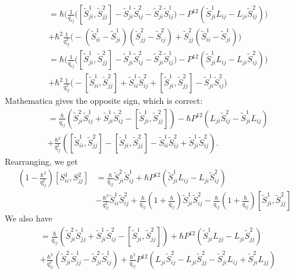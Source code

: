 \documentclass[11pt]{report}
\theoremstyle{definition}
\theoremstyle{remark}
\theoremstyle{remark}
\begin{document}
\begin{align*}
&= \hbar \bigg( \frac{1}{q_{ij}} \bigg( [\tilde S_{ji}^1,\tilde S_{jj}^2] - \tilde S_{ji}^1 \tilde S_{ij}^2 - \tilde S_{ji}^2 \tilde S_{ij}^1 \bigg) - P^{12}(\tilde S_{ji}^1 L_{ij} -L_{ji} \tilde S_{ij}^2) \bigg) \\
&+ \hbar^2 \frac{1}{q_{ij}^2} \bigg( -(\tilde S_{ii}^1-\tilde S_{ji}^1) (\tilde S_{jj}^2-\tilde S_{ij}^2) + \tilde S_{jj}^2 (\tilde S_{ii}^1-\tilde S_{ji}^1) \bigg) \\
&= \hbar \bigg( \frac{1}{q_{ij}} \bigg( [\tilde S_{ji}^1,\tilde S_{jj}^2] - \tilde S_{ji}^1 \tilde S_{ij}^2 - \tilde S_{ji}^2 \tilde S_{ij}^1 \bigg) - P^{12}(\tilde S_{ji}^1 L_{ij} -L_{ji} \tilde S_{ij}^2) \bigg) \\
&+ \hbar^2 \frac{1}{q_{ij}^2} \bigg( -[\tilde S_{ii}^1,\tilde S_{jj}^2] + \tilde S_{ii}^1 \tilde S_{ij}^2 + [\tilde S_{ji}^1,\tilde S_{jj}^2] - \tilde S_{ji}^1 \tilde S_{ij}^2 \bigg)
\end{align*}
Mathematica gives the opposite sign, which is correct:
\begin{align*}
[\tilde S_{ii}^1,\tilde S_{jj}^2]
&= \frac{\hbar}{q_{ij}} (\tilde S_{ji}^2 \tilde S_{ij}^1 + \tilde S_{ji}^1 \tilde S_{ij}^2 - [\tilde S_{ji}^1,\tilde S_{jj}^2]) - \hbar P^{12} (L_{ji} \tilde S_{ij}^2 - \tilde S_{ji}^1 L_{ij}) \\
&+ \frac{\hbar^2}{q_{ij}^2} ([\tilde S_{ii}^1,\tilde S_{jj}^2] - [\tilde S_{ji}^1,\tilde S_{jj}^2] - \tilde S_{ii}^1 \tilde S_{ij}^2 + \tilde S_{ji}^1 \tilde S_{ij}^2).
\end{align*}
Rearranging, we get
\begin{align*}
(1 - \frac{\hbar^2}{q_{ij}^2})[S_{ii}^1,S_{jj}^2]
&= \frac{\hbar}{q_{ij}} \tilde S_{ji}^2 \tilde S_{ij}^1 + \hbar P^{12}(\tilde S_{ji}^1 L_{ij}-L_{ji} \tilde S_{ij}^2) \\
&- \frac{\hbar^2}{q_{ij}^2} \tilde S_{ii}^1 \tilde S_{ij}^2 + \frac{\hbar}{q_{ij}} (1 + \frac{\hbar}{q_{ij}}) \tilde S_{ji}^1 \tilde S_{ij}^2 - \frac{\hbar}{q_{ij}} (1 + \frac{\hbar}{q_{ij}}) [\tilde S_{ji}^1,\tilde S_{jj}^2]
\end{align*}
We also have
\begin{align*}
[\tilde S_{ji}^1,\tilde S_{jj}^2]
&= \frac{\hbar}{q_{ij}} (\tilde S_{ji}^2 \tilde S_{jj}^1+\tilde S_{ji}^1 \tilde S_{ij}^2 - [\tilde S_{ji}^1,\tilde S_{jj}^2]) + \hbar P^{12}(\tilde S_{ji}^1 L_{jj} - L_{ji} \tilde S_{jj}^2) \\
&+ \frac{\hbar^2}{q_{ij}^2} (\tilde S_{ji}^2 \tilde S_{jj}^1 - \tilde S_{ji}^2 \tilde S_{ij}^1) + \frac{\hbar^2}{q_{ij}} P^{12}(L_{ji} \tilde S_{ij}^2 - L_{ji} \tilde S_{jj}^2 - \tilde S_{ji}^2 L_{ij} + \tilde S_{ji}^2 L_{jj})
\end{align*}
\end{document}
